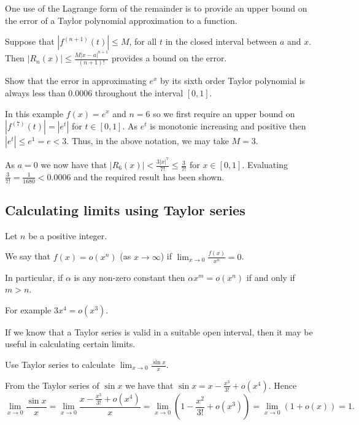 \documentclass[10pt, a4paper]{article}
\begin{document}
One use of the Lagrange form of the remainder is to provide an upper bound on the error of a Taylor polynomial approximation to a function.

Suppose that $|f ^ {(n + 1)}(t)| \leq M$,
for all $t$ in the closed interval between $a$ and $x$.
Then $|R_n(x)| \leq \frac{M|x - a| ^ {n + 1}}{(n + 1)!}$ provides a bound on the error.

\begin{example}
    Show that the error in approximating $e ^ x$ by its sixth order Taylor polynomial is always less than $0.0006$ throughout the interval $[0, 1]$.

    In this example $f(x) = e ^ x$ and $n = 6$ so we first require an upper bound on $|f ^ {(7)}(t)| = |e ^ t|$ for $t \in [0, 1]$.
    As $e ^ t$ is monotonic increasing and positive then $|e ^ t| \leq e ^ 1 = e < 3$.
    Thus,
    in the above notation,
    we may take $M = 3$.

    As $a = 0$ we now have that $|R_6(x)| < \frac{3|x| ^ 7}{7!} \leq \frac{3}{7!}$ for $x \in [0, 1]$.
    Evaluating $\frac{3}{7!} = \frac{1}{1680} < 0.0006$ and the required result has been shown.
\end{example}

\subsection{Calculating limits using Taylor series}

\begin{definition}
    Let $n$ be a positive integer.
    
    We say that $f(x) = o(x ^ n)$ (as $x \rightarrow \infty$) if $\lim_{x \rightarrow 0}\frac{f(x)}{x ^ n} = 0$.
\end{definition}

In particular,
if $\alpha$ is any non-zero constant then $\alpha x ^ m = o(x ^ n)$ if and only if $m > n$.

For example $3x ^ 4 = o(x ^ 3)$.

If we know that a Taylor series is valid in a suitable open interval,
then it may be useful in calculating certain limits.

\begin{example}
    Use Taylor series to calculate $\lim_{x \rightarrow 0}\frac{\sin{x}}{x}$.

    From the Taylor series of $\sin{x}$ we have that $\sin{x} = x - \frac{x ^ 3}{3!} + o(x ^ 4)$.
    Hence
    \[
    \lim_{x \rightarrow 0}\frac{\sin{x}}{x} = \lim_{x \rightarrow 0}\frac{x - \frac{x ^ 3}{3!} + o(x ^ 4)}{x} = \lim_{x \rightarrow 0}\left(1 - \frac{x ^ 2}{3!} + o(x ^ 3)\right) = \lim_{x \rightarrow 0}(1 + o(x)) = 1.
    \]
\end{example}
\end{document}
